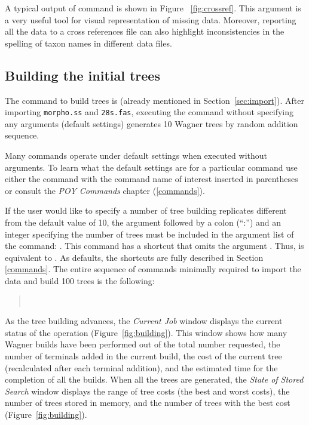 {A typical output of  command is
shown in Figure ~\ref{fig:crossref}. This argument is a very useful
tool for visual representation of missing data. Moreover, reporting
all the data to a cross references file can also highlight
inconsistencies in the spelling of taxon names in different data
files.

\subsection{Building the initial trees}

The command to build trees is  (already
mentioned in Section~\ref{sec:import}). After importing \texttt{morpho.ss}
and \texttt{28s.fas}, executing the command 
without specifying any arguments (default settings) generates 10
Wagner trees by random addition sequence.

Many \poy commands operate under default settings when executed
without arguments. To learn what the default settings are for a
particular command use either the  command with
the command name of interest inserted in parentheses or consult the
\emph{POY Commands} chapter (\ref{commands}).

If the user would like to specify a number of tree building replicates
different from the default value of 10, the argument 
followed by a colon (``:'') and an integer specifying the number
of trees must be included in the argument list of the 
command: . This command has a shortcut
that omits the argument . Thus,
 is equivalent to .
As defaults, the shortcuts are fully described in Section \ref{commands}.
The entire sequence of commands minimally required to import the
data and build 100 trees is the following:

\begin{quote}
\\
\end{quote}

As the tree building advances, the \emph{Current Job} window displays
the current status of the operation (Figure~\ref{fig:building}).
This window shows how many Wagner builds have been performed out
of the total number requested, the number of terminals added in the
current build, the cost of the current tree (recalculated after
each terminal addition), and the estimated time for the completion
of all the builds. When all the trees are generated, the \emph{State
of Stored Search} window displays the range of tree costs (the best
and worst costs), the number of trees stored in memory, and the
number of trees with the best cost (Figure~\ref{fig:building}).

}

